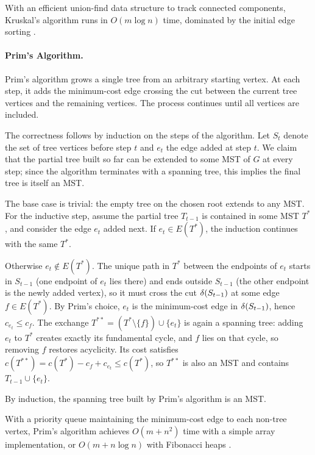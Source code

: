 With an efficient union-find data structure to track connected components, Kruskal's algorithm runs in $O(m \log n)$ time, dominated by the initial edge sorting \cite[Theorem~6.5]{KorteVygen2018}.

\paragraph{Prim's Algorithm.}

Prim's algorithm grows a single tree from an arbitrary starting vertex.
At each step, it adds the minimum-cost edge crossing the cut between the current tree vertices and the remaining vertices.
The process continues until all vertices are included.

The correctness follows by induction on the steps of the algorithm.
Let $S_t$ denote the set of tree vertices before step $t$ and $e_t$ the edge added at step $t$.
We claim that the partial tree built so far can be extended to some MST of $G$ at every step; since the algorithm terminates with a spanning tree, this implies the final tree is itself an MST.

The base case is trivial: the empty tree on the chosen root extends to any MST.
For the inductive step, assume the partial tree $T_{t-1}$ is contained in some MST $T^*$, and consider the edge $e_t$ added next.
If $e_t \in E(T^*)$, the induction continues with the same $T^*$.

Otherwise $e_t \notin E(T^*)$.
The unique path in $T^*$ between the endpoints of $e_t$ starts in $S_{t-1}$ (one endpoint of $e_t$ lies there) and ends outside $S_{t-1}$ (the other endpoint is the newly added vertex), so it must cross the cut $\delta(S_{t-1})$ at some edge $f \in E(T^*)$.
By Prim's choice, $e_t$ is the minimum-cost edge in $\delta(S_{t-1})$, hence $c_{e_t} \leq c_f$.
The exchange $T^{**} = (T^* \setminus \{f\}) \cup \{e_t\}$ is again a spanning tree: adding $e_t$ to $T^*$ creates exactly its fundamental cycle, and $f$ lies on that cycle, so removing $f$ restores acyclicity.
Its cost satisfies $c(T^{**}) = c(T^*) - c_f + c_{e_t} \leq c(T^*)$, so $T^{**}$ is also an MST and contains $T_{t-1} \cup \{e_t\}$.

By induction, the spanning tree built by Prim's algorithm is an MST.

With a priority queue maintaining the minimum-cost edge to each non-tree vertex, Prim's algorithm achieves $O(m + n^2)$ time with a simple array implementation, or $O(m + n \log n)$ with Fibonacci heaps \cite[Theorem~6.7]{KorteVygen2018}.

